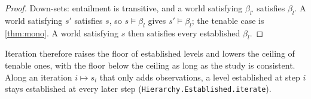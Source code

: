 \begin{proof}
Down-sets: entailment is transitive, and a world satisfying $\beta_{l'}$ satisfies $\beta_l$. A
world satisfying $s'$ satisfies $s$, so $s\models\beta_l$ gives $s'\models\beta_l$; the tenable case
is \cref{thm:mono}. A world satisfying $s$ then satisfies every established $\beta_l$.
\end{proof}

Iteration therefore raises the floor of established levels and lowers the ceiling of tenable
ones, with the floor below the ceiling as long as the study is consistent. Along an iteration
$i\mapsto s_i$ that only adds observations, a level established at step $i$ stays established at
every later step (\texttt{Hierarchy.Established.iterate}).
